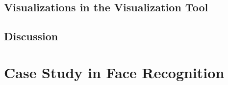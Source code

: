 

\begin{comment}
The page presents a grid of figures, with a synthesized image for each network unit chosen for visualization. The synthesized images are optimized to maximally activate their corresponding unit. In other words, they show what the selected units are looking for in an image.
\end{comment}

\subsection{Visualizations in the Visualization Tool}


\subsection{Discussion} %


\section{Case Study in Face Recognition}

